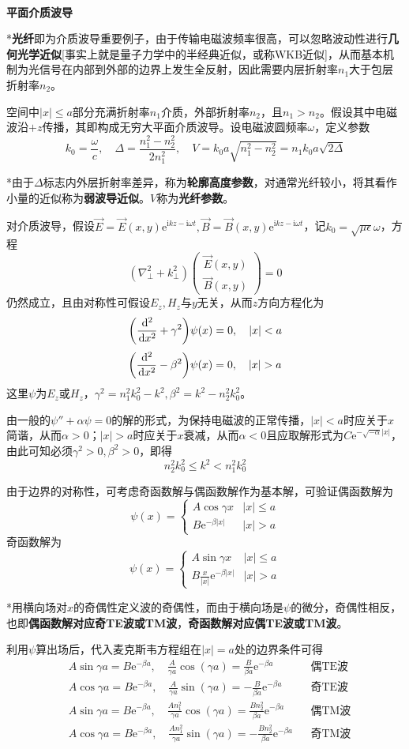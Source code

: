\documentclass[a4paper,UTF8,fontset=windows]{ctexart}
\newcommand*{\dr}{\hspace{0.07em}\mathrm{d}}
\newcommand*{\er}{\mathrm{e}}
\newcommand*{\ir}{\mathrm{i}}
\newcommand*{\vb}{\vec{B}}
\newcommand*{\ve}{\vec{E}}
\newcommand*{\dt}[2][t]{\frac{\dr #2}{\dr #1}}
\begin{document}
\

\textbf{平面介质波导}

*\textbf{光纤}即为介质波导重要例子，由于传输电磁波频率很高，可以忽略波动性进行\textbf{几何光学近似}[事实上就是量子力学中的半经典近似，或称WKB近似]，从而基本机制为光信号在内部到外部的边界上发生全反射，因此需要内层折射率$n_1$大于包层折射率$n_2$。

空间中$|x|\le a$部分充满折射率$n_1$介质，外部折射率$n_2$，且$n_1>n_2$。假设其中电磁波沿$+z$传播，其即构成无穷大平面介质波导。设电磁波圆频率$\omega$，定义参数
$$k_0=\frac{\omega}{c},\quad\Delta=\frac{n_1^2-n_2^2}{2n_1^2},\quad V=k_0a\sqrt{n_1^2-n_2^2}=n_1k_0a\sqrt{2\Delta}$$

*由于$\Delta$标志内外层折射率差异，称为\textbf{轮廓高度参数}，对通常光纤较小，将其看作小量的近似称为\textbf{弱波导近似}。$V$称为\textbf{光纤参数}。

对介质波导，假设$\ve=\ve(x,y)\er^{\ir kz-\ir\omega t},\vb=\vb(x,y)\er^{\ir kz-\ir\omega t}$，记$k_0=\sqrt{\mu\epsilon}\omega$，方程
$$(\nabla_\bot^2+k_\bot^2)\begin{pmatrix}\ve(x,y)\\\vb(x,y)\end{pmatrix}=0$$
仍然成立，且由对称性可假设$E_z,H_z$与$y$无关，从而$z$方向方程化为
$$\bigg(\dt[x^2]{ ^2}+\gamma^2\bigg)\psi(x)=0,\quad|x|<a$$
$$\bigg(\dt[x^2]{ ^2}-\beta^2\bigg)\psi(x)=0,\quad|x|>a$$
这里$\psi$为$E_z$或$H_z$，$\gamma^2=n_1^2k_0^2-k^2,\beta^2=k^2-n_2^2k_0^2$。

由一般的$\psi''+\alpha\psi=0$的解的形式，为保持电磁波的正常传播，$|x|<a$时应关于$x$简谐，从而$\alpha>0$；$|x|>a$时应关于$x$衰减，从而$\alpha<0$且应取解形式为$C\er^{-\sqrt{-\alpha}|x|}$，由此可知必须$\gamma^2>0,\beta^2>0$，即得
$$n_2^2k_0^2\le k^2<n_1^2k_0^2$$

由于边界的对称性，可考虑奇函数解与偶函数解作为基本解，可验证偶函数解为
$$\psi(x)=\begin{cases}A\cos\gamma x&|x|\le a\\B\er^{-\beta|x|}&|x|>a\end{cases}$$
奇函数解为
$$\psi(x)=\begin{cases}A\sin\gamma x&|x|\le a\\B\frac{x}{|x|}\er^{-\beta|x|}&|x|>a\end{cases}$$

*用横向场对$x$的奇偶性定义波的奇偶性，而由于横向场是$\psi$的微分，奇偶性相反，也即\textbf{偶函数解对应奇TE波或TM波}，\textbf{奇函数解对应偶TE波或TM波}。

利用$\psi$算出场后，代入麦克斯韦方程组在$|x|=a$处的边界条件可得
$$\begin{aligned}&A\sin\gamma a=B\er^{-\beta a},\quad\frac{A}{\gamma a}\cos(\gamma a)=\frac{B}{\beta a}\er^{-\beta a}&&\text{偶TE波}\\ &A\cos\gamma a=B\er^{-\beta a},\quad\frac{A}{\gamma a}\sin(\gamma a)=-\frac{B}{\beta a}\er^{-\beta a}&&\text{奇TE波}\\ &A\sin\gamma a=B\er^{-\beta a},\quad\frac{An_1^2}{\gamma a}\cos(\gamma a)=\frac{Bn_2^2}{\beta a}\er^{-\beta a}&&\text{偶TM波}\\ &A\cos\gamma a=B\er^{-\beta a},\quad\frac{An_1^2}{\gamma a}\sin(\gamma a)=-\frac{Bn_2^2}{\beta a}\er^{-\beta a}&&\text{奇TM波}\end{aligned}$$
\end{document}
